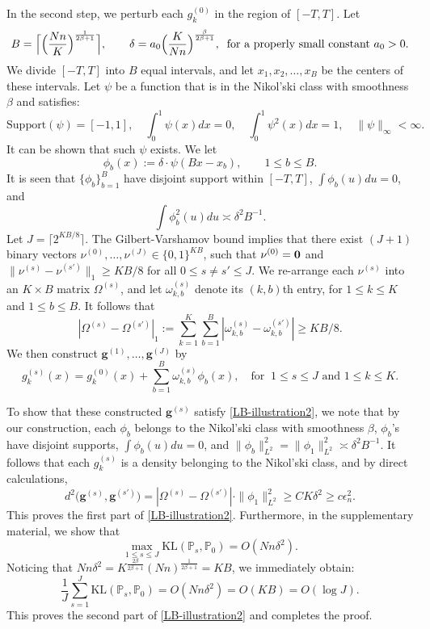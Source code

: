 \documentclass[preprint,11pt]{article}
\newcommand{\mbb}{\mathbb}
\numberwithin{equation}{section}
\newcommand{\beq}{\begin{equation}}
\newcommand{\eeq}{\end{equation}}
\begin{document}
In the second step, we perturb each $g_k^{(0)}$ in the region of $[-T, T]$. Let 
\[
B=\Big\lceil\Bigl(\frac{Nn}{K}\Bigr)^{\frac{1}{2\beta+1}}\Bigr\rceil, \qquad \delta = a_0\Bigl(\frac{K}{Nn}\Bigr)^{\frac{\beta}{2\beta+1}},\;\; \mbox{for a properly small constant $a_0>0$}. 
\]
We divide $[-T, T]$ into $B$ equal intervals, and let $x_1, x_2, \ldots, x_B$ be the centers of these intervals.
Let $\psi$ be a function that is in the Nikol’ski class with smoothness $\beta$ and satisfies:  
\[
\mathrm{Support}(\psi)=[-1,1], \quad \int_0^1 \psi(x)dx=0, \quad \int_0^1 \psi^2(x)dx=1, \quad \|\psi\|_{\infty}<\infty. 
\]
It can be shown that such $\psi$ exists. We let
\[
    \phi_b(x):=\delta\cdot \psi\left(Bx-x_b\right), \qquad 1\leq b \leq B. 
\]
It is seen that $\{\phi_b\}_{b=1}^B$ have disjoint support within $[-T,T]$, $\int \phi_b(u)du=0$, and 
\[
\int \phi^2_b(u)du\asymp \delta^2B^{-1}.
\] 
Let $J=\lceil 2^{KB/8}\rceil$. The Gilbert-Varshamov bound implies that there exist $(J+1)$ binary vectors $\nu^{(0)},\ldots,\nu^{(J)}\in \{0,1\}^{KB}$, such that $\nu^{(0)}={\bf 0}$ and $\|\nu^{(s)}-\nu^{(s')}\|_1\ge KB/8$ for all $0\leq s\neq s'\leq J$. We re-arrange each $\nu^{(s)}$ into an $K\times B$ matrix $\Omega^{(s)}$, and let $\omega_{k,b}^{(s)}$ denote its $(k, b)$th entry, for $1\leq k\leq K$ and $1\leq b\leq B$. It follows that
\beq\label{LB-illustration3}
|\Omega^{(s)}-\Omega^{(s')}|_1:= \sum_{k=1}^K \sum_{b=1}^B |\omega_{k,b}^{(s)}-\omega_{k,b}^{(s')}|\geq KB/8. 
\eeq 
We then construct $\bm{g}^{(1)},\ldots, \bm{g}^{(J)}$ by 
\beq \label{LB-illustration4}
    g_k^{(s)}(x)=g_k^{(0)}(x)+ \sum_{b=1}^B\omega_{k,b}^{(s)}\phi_b(x),\quad \text{for }\ 1\leq s\leq J \mbox{ and }1\leq k\leq K.
\eeq

To show that these constructed $\bm{g}^{(s)}$ satisfy \eqref{LB-illustration2}, we note that by our construction, each $\phi_b$ belongs to the Nikol’ski class with smoothness $\beta$, $\phi_b$'s have disjoint supports, $\int \phi_b(u)du=0$, and $\|\phi_b\|^2_{L^2}=\|\phi_1\|^2_{L^2}\asymp \delta^2 B^{-1}$. It follows that each $g_k^{(s)}$ is a density belonging to the Nikol’ski class, and by direct calculations, 
\[
d^2\bigl(\bm{g}^{(s)}, \bm{g}^{(s')}\bigr) = |\Omega^{(s)}-\Omega^{(s')}|\cdot \|\phi_1\|^2_{L^2} \geq C K\delta^2\geq c\epsilon_n^2.  
\]
This proves the first part of \eqref{LB-illustration2}. Furthermore, in the supplementary material, we show that 
\[
\max_{1\leq s\leq J} \mathrm{KL}(\mathbb{P}_s, \mathbb{P}_0) = O(Nn\delta^2). 
\]
Noticing that $Nn\delta^2 = K^{\frac{2\beta}{2\beta+1}}(Nn)^{\frac{1}{2\beta+1}}= KB$, we immediately obtain:
\[
    \frac{1}{J}\sum_{s=1}^J \mathrm{KL}(\mbb{P}_s,\mbb{P}_0)=O(Nn\delta^2)=O(KB)=O(\log J).
\]
This proves the second part of \eqref{LB-illustration2} and completes the proof. 
\end{document}
